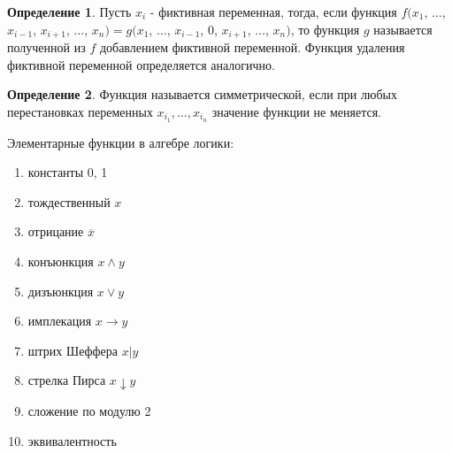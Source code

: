 \documentclass[a4paper, 12pt]{article}
\theoremstyle{definition}
\newtheorem*{definition}{Определение}
\theoremstyle{plain}
\theoremstyle{remark}
\begin{document}
  \begin{definition}
    Пусть $x_i$ - фиктивная переменная, тогда, если функция $f(x_1$, $\ldots$, $x_{i-1}$, $x_{i+1}$, $\ldots$, $x_n)=g(x_1$, $\ldots$, $x_{i-1}$, $0$, $x_{i+1}$, $\ldots$, $x_n)$, то функция $g$ называется полученной из $f$ добавлением фиктивной переменной. Функция удаления фиктивной переменной определяется аналогично.
  \end{definition}
  \begin{definition}
    Функция называется симметрической, если при любых перестановках переменных $x_{i_1}, \ldots, x_{i_n}$ значение функции не меняется.
  \end{definition}
  Элементарные функции в алгебре логики:
  \begin{enumerate}
    \item константы 0, 1
    \item тождественный $x$
    \item отрицание $\overline{x}$
    \item конъюнкция $x\wedge y$
    \item дизъюнкция $x\vee y$
    \item имплекация $x\rightarrow y$
    \item штрих Шеффера $x|y$
    \item стрелка Пирса $x\downarrow y$
    \item сложение по модулю 2
    \item эквивалентность
  \end{enumerate}
\end{document}
